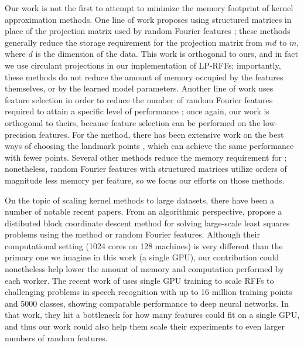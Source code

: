 Our work is not the first to attempt to minimize the memory footprint of kernel approximation methods.  One line of work proposes using structured matrices in place of the projection matrix used by random Fourier features \citep{fastfood,yu15,sphereRKS}; these methods generally reduce the storage requirement for the projection matrix from $md$ to $m$, where $d$ is the dimension of the data. This work is orthogonal to ours, and in fact we use circulant projections \citep{yu15} in our implementation of LP-RFFs; importantly, these methods do not reduce the amount of memory occupied by the features themselves, or by the learned model parameters. Another line of work uses feature selection in order to reduce the number of random Fourier features required to attain a specific level of performance \citep{sparseRKS, may2016}; once again, our work is orthogonal to theirs, because feature selection can be performed on the low-precision features.  For the \Nystrom method, there has been extensive work on the best ways of choosing the landmark points \citep{kmeans08,kumar12,gittens13}, which can achieve the same performance with fewer points.  Several other methods reduce the memory requirement for \Nystrom \cite{ensemble09,fastpred14,meka14}; nonetheless, random Fourier features with structured matrices utilize orders of magnitude less memory per feature, so we focus our efforts on those methods.

On the topic of scaling kernel methods to large datasets, there have been a number of notable recent papers.  From an algorithmic perspective, \citet{block16} propose a distibuted block coordinate descent method for solving large-scale least squares problems using the \Nystrom method or random Fourier features.  Although their computational setting (1024 cores on 128 machines) is very different than the primary one we imagine in this work (a single GPU), our contribution could nonetheless help lower the amount of memory and computation performed by each worker.  The recent work of \citet{may2017} uses single GPU training to scale RFFs to challenging problems in speech recognition with up to 16 million training points and 5000 classes, showing comparable performance to deep neural networks. In that work, they hit a bottleneck for how many features could fit on a single GPU, and thus our work could also help them scale their experiments to even larger numbers of random features.

